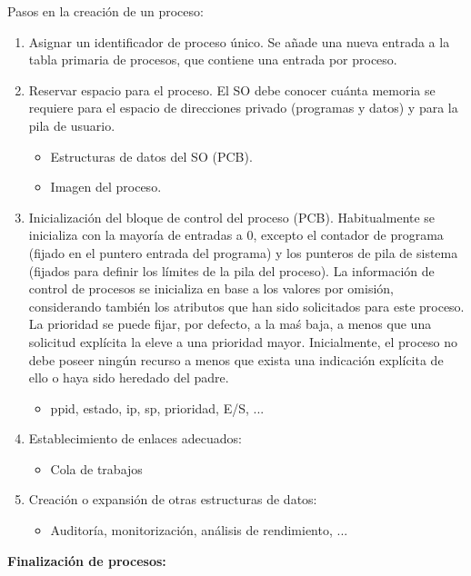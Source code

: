 \documentclass{article}
\begin{document}
Pasos en la creación de un proceso:
\begin{enumerate}
\item Asignar un identificador de proceso único. Se añade una nueva entrada a la tabla primaria de procesos, que contiene una entrada por proceso.

\item Reservar espacio para el proceso. El SO debe conocer cuánta memoria se requiere para el espacio de direcciones privado (programas y datos) y para la pila de usuario. 
	\begin{itemize}
	\item Estructuras de datos del SO (PCB).
	
	\item Imagen del proceso.
	\end{itemize}
	
\item Inicialización del bloque de control del proceso (PCB). Habitualmente se inicializa con la mayoría de entradas a 0, excepto el contador de programa (fijado en el puntero entrada del programa) y los punteros de pila de sistema (fijados para definir los límites de la pila del proceso). La información de control de procesos se inicializa en base a los valores por omisión, considerando también los atributos que han sido solicitados para este proceso. La prioridad se puede fijar, por defecto, a la maś baja, a menos que una solicitud explícita la eleve a una prioridad mayor. Inicialmente, el proceso no debe poseer ningún recurso a menos que exista una indicación explícita de ello o haya sido heredado del padre.
	\begin{itemize}
	\item ppid, estado, ip, sp, prioridad, E/S, ...
	\end{itemize}
	
\item Establecimiento de enlaces adecuados:
	\begin{itemize}
	\item Cola de trabajos
	\end{itemize}
	
\item Creación o expansión de otras estructuras de datos:
	\begin{itemize}
	\item Auditoría, monitorización, análisis de rendimiento, ...
	\end{itemize}
\end{enumerate}

\textbf{Finalización de procesos:}
\end{document}
